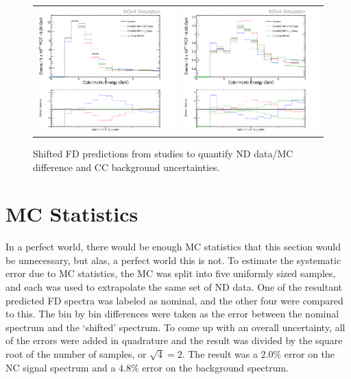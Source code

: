 \begin{figure}[htb]
  \centering
  \begin{tabular}{c c}
    \includegraphics[width=.47\textwidth]{figures/Systs/cNCEXDecompSysts.png} &
    \includegraphics[width=.47\linewidth]{figures/Systs/cBGEXDecompSysts.png} \\
  \end{tabular}
  \caption[Systematic Error Due to ND Data/MC Discrepancy and CC Background Uncertainty]{Shifted FD predictions from studies to quantify ND data/MC difference and CC background uncertainties.}
  \label{fig:SystNDDataMC}
\end{figure}

\section{MC Statistics}
\label{sec:SystMCStats}

In a perfect world, there would be enough MC statistics that this section would be unnecessary, but alas, a perfect world this is not. To estimate the systematic error due to MC statistics, the MC was split into five uniformly sized samples, and each was used to extrapolate the same set of ND data. One of the resultant predicted FD spectra was labeled as nominal, and the other four were compared to this. The bin by bin differences were taken as the error between the nominal spectrum and the `shifted' spectrum. To come up with an overall uncertainty, all of the errors were added in quadrature and the result was divided by the square root of the number of samples, or $\sqrt{4} = 2$. The result was a $2.0\%$ error on the NC signal spectrum and a $4.8\%$ error on the background spectrum.

